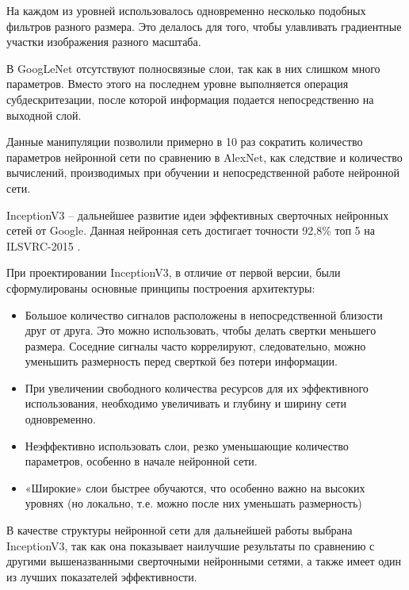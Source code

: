 На каждом из уровней использовалось одновременно несколько подобных фильтров разного размера. 
Это делалось для того, чтобы улавливать градиентные участки изображения разного масштаба.

В GoogLeNet отсутствуют полносвязные слои, так как в них слишком много параметров. 
Вместо этого на последнем уровне выполняется операция субдескритезации, после которой информация подается непосредственно на выходной слой.

Данные манипуляции позволили примерно в 10 раз сократить количество параметров нейронной сети по сравнению в AlexNet, как следствие и количество вычислений, производимых при обучении и непосредственной работе нейронной сети.

InceptionV3 – дальнейшее развитие идеи эффективных сверточных нейронных сетей от Google. Данная нейронная сеть достигает точности 92,8\% топ 5 на ILSVRC-2015 \cite{imagenet-challenge}.
 

При проектировании InceptionV3, в отличие от первой версии, были сформулированы основные принципы построения архитектуры:
\begin{itemize}
    \item Большое количество сигналов расположены в непосредственной близости друг от друга. Это можно использовать, чтобы делать свертки меньшего размера. Соседние сигналы часто коррелируют, следовательно, можно уменьшить размерность перед сверткой без потери информации.
    \item При увеличении свободного количества ресурсов для их эффективного использования, необходимо увеличивать и глубину и ширину сети одновременно. 
    \item Неэффективно использовать слои, резко уменьшающие количество параметров, особенно в начале нейронной сети.
    \item «Широкие» слои быстрее обучаются, что особенно важно на высоких уровнях (но локально, т.е. можно после них уменьшать размерность)
\end{itemize}


В качестве структуры нейронной сети для дальнейшей работы выбрана InceptionV3, так как она показывает наилучшие результаты по сравнению с другими вышеназванными сверточными нейронными сетями, а также имеет один из лучших показателей эффективности.

